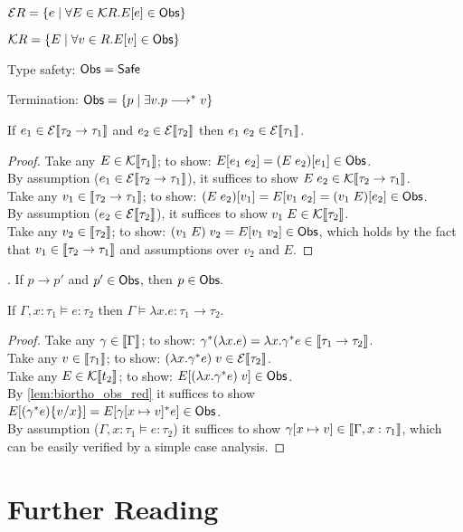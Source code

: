$\mathcal{E}R = \{ e \mid \forall E \in \mathcal{K} R. E[e] \in \mathsf{Obs} \}$

$\mathcal{K}R = \{ E \mid \forall v \in R. E[v] \in \mathsf{Obs} \}$

Type safety: $\mathsf{Obs} = \mathsf{Safe}$

Termination: $\mathsf{Obs} = \{ p \mid \exists v. p \longrightarrow^* v\}$

\begin{lemma}
  If $e_1 \in \mathcal{E}\llbracket\tau_2 \to \tau_1\rrbracket$
  and $e_2 \in \mathcal{E}\llbracket\tau_2\rrbracket$
  then $e_1\;e_2 \in \mathcal{E}\llbracket\tau_1\rrbracket$.
\end{lemma}
\begin{proof}
  Take any $E \in \mathcal{K}\llbracket\tau_1\rrbracket$;
    to show: $E[e_1\;e_2] = (E\;e_2)[e_1] \in \mathsf{Obs}$. \\
  By assumption ($e_1 \in \mathcal{E}\llbracket\tau_2 \to \tau_1\rrbracket$),
    it suffices to show $E\;e_2 \in \mathcal{K}\llbracket\tau_2 \to \tau_1\rrbracket$. \\
  Take any $v_1 \in \llbracket\tau_2 \to \tau_1\rrbracket$;
    to show: $(E\;e_2)[v_1] = E[v_1\;e_2] = (v_1\;E)[e_2] \in \mathsf{Obs}$. \\
  By assumption ($e_2 \in \mathcal{E}\llbracket\tau_2\rrbracket$),
    it suffices to show $v_1\;E\in\mathcal{K}\llbracket\tau_2\rrbracket$. \\
  Take any $v_2 \in \llbracket\tau_2\rrbracket$;
    to show: $(v_1\;E)\;v_2 = E[v_1\;v_2] \in \mathsf{Obs}$, which holds
    by the fact that $v_1\in\llbracket\tau_2\to\tau_1\rrbracket$
    and assumptions over $v_2$ and $E$.
\end{proof}

\begin{lemma}\label{lem:biortho_obs_red}.
  If $p \longrightarrow p'$ and $p' \in \mathsf{Obs}$, then $p \in \mathsf{Obs}.$
\end{lemma}

\begin{lemma}
  If $\Gamma,x : \tau_1 \models e : \tau_2$
  then $\Gamma\models \lambda x.e : \tau_1 \to \tau_2$.
\end{lemma}
\begin{proof}
  Take any $\gamma \in \llbracket\Gamma\rrbracket$;
    to show: $\gamma^*(\lambda x.e) =
      \lambda x.\gamma^* e \in \llbracket\tau_1 \to \tau_2\rrbracket$. \\
  Take any $v \in \llbracket\tau_1\rrbracket$;
    to show: $(\lambda x.\gamma^* e)\;v \in \mathcal{E}\llbracket\tau_2\rrbracket$.\\
  Take any $E \in \mathcal{K}\llbracket t_2\rrbracket$;
    to show: $E[(\lambda x.\gamma^* e)\;v] \in \mathsf{Obs}$.\\
  By \autoref{lem:biortho_obs_red} it suffices to show
    $E[(\gamma^* e)\{v/x\}] = E[\gamma[x\mapsto v]^* e] \in \mathsf{Obs}$. \\
  By assumption ($\Gamma,x : \tau_1\models e : \tau_2$)
    it suffices to show $\gamma[x\mapsto v] \in \llbracket\Gamma,x : \tau_1\rrbracket$,
    which can be easily verified by a simple case analysis.
\end{proof}

\section{Further Reading}

